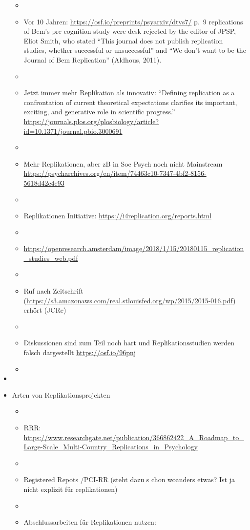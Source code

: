 \documentclass[
  letterpaper,
  DIV=11,
  numbers=noendperiod]{scrreprt}
\begin{document}
\begin{itemize}
  \begin{itemize}
  \item
  \item
    Vor 10 Jahren: \url{https://osf.io/preprints/psyarxiv/dtvs7/} p.~9
    replications of Bem's pre-cognition study were desk-rejected by the
    editor of JPSP, Eliot Smith, who stated ``This journal does not
    publish replication studies, whether successful or unsuccessful''
    and ``We don't want to be the Journal of Bem Replication'' (Aldhous,
    2011).
  \item
  \item
    Jetzt immer mehr Replikation als innovativ: ``Defining replication
    as a confrontation of current theoretical expectations clarifies its
    important, exciting, and generative role in scientific progress.''
    \url{https://journals.plos.org/plosbiology/article?id=10.1371/journal.pbio.3000691}
  \item
  \item
    Mehr Replikationen, aber zB in Soc Psych noch nicht Mainstream
    \url{https://psycharchives.org/en/item/74463c10-7347-4bf2-8156-5618d42c4e93}
  \item
  \item
    Replikationen Initiative:
    \url{https://i4replication.org/reports.html}
  \item
  \item
    \url{https://openresearch.amsterdam/image/2018/1/15/20180115_replication_studies_web.pdf}
  \item
  \item
    Ruf nach Zeitschrift
    (\url{https://s3.amazonaws.com/real.stlouisfed.org/wp/2015/2015-016.pdf})
    erhört (JCRe)
  \item
  \item
    Diskussionen sind zum Teil noch hart und Replikationsstudien werden
    falsch dargestellt \url{https://osf.io/96pnj}
  \item
  \end{itemize}
\item
\item
  Arten von Replikationsprojekten

  \begin{itemize}
  \item
  \item
    RRR:
    \url{https://www.researchgate.net/publication/366862422_A_Roadmap_to_Large-Scale_Multi-Country_Replications_in_Psychology}
  \item
  \item
    Registered Repots /PCI-RR (steht dazu s chon woanders etwas? Ist ja
    nicht explizit für replikationen)
  \item
  \item
    Abschlussarbeiten für Replikationen nutzen:


\end{itemize}
\end{itemize}
\end{document}
